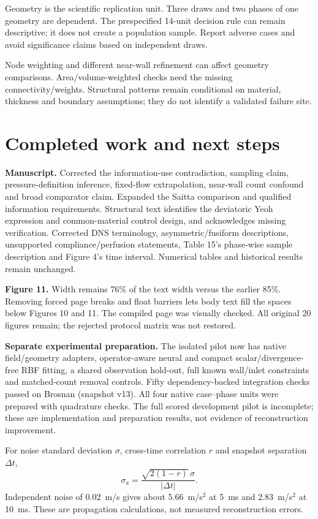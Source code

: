 \documentclass[11pt,a4paper]{article}
\begin{document}
Geometry is the scientific replication unit. Three draws and two phases of one geometry are dependent. The prespecified 14-unit decision rule can remain descriptive; it does not create a population sample. Report adverse cases and avoid significance claims based on independent draws.

Node weighting and different near-wall refinement can affect geometry comparisons. Area/volume-weighted checks need the missing connectivity/weights. Structural patterns remain conditional on material, thickness and boundary assumptions; they do not identify a validated failure site.

\section{Completed work and next steps}

\textbf{Manuscript.} Corrected the information-use contradiction, sampling claim, pressure-definition inference, fixed-flow extrapolation, near-wall count confound and broad comparator claim. Expanded the Saitta comparison and qualified information requirements. Structural text identifies the deviatoric Yeoh expression and common-material control design, and acknowledges missing verification. Corrected DNS terminology, asymmetric/fusiform descriptions, unsupported compliance/perfusion statements, Table 15's phase-wise sample description and Figure 4's time interval. Numerical tables and historical results remain unchanged.

\textbf{Figure 11.} Width remains 76\% of the text width versus the earlier 85\%. Removing forced page breaks and float barriers lets body text fill the spaces below Figures 10 and 11. The compiled page was visually checked. All original 20 figures remain; the rejected protocol matrix was not restored.

\textbf{Separate experimental preparation.} The isolated pilot now has native field/geometry adapters, operator-aware neural and compact scalar/divergence-free RBF fitting, a shared observation hold-out, full known wall/inlet constraints and matched-count removal controls. Fifty dependency-backed integration checks passed on Brosnan (snapshot v13). All four native case--phase units were prepared with quadrature checks. The full scored development pilot is incomplete; these are implementation and preparation results, not evidence of reconstruction improvement.

For noise standard deviation $\sigma$, cross-time correlation $r$ and snapshot separation $\Delta t$,
\[
 \sigma_a=\frac{\sqrt{2(1-r)}\,\sigma}{|\Delta t|}.
\]
Independent noise of 0.02~m/s gives about 5.66~m/s$^2$ at 5~ms and 2.83~m/s$^2$ at 10~ms. These are propagation calculations, not measured reconstruction errors.
\end{document}
